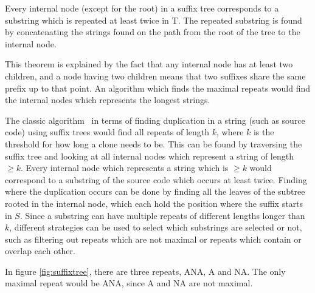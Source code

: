 \begin{theorem}

    Every internal node (except for the root) in a suffix tree corresponds to a substring
    which is repeated at least twice in T. The repeated substring is found by
    concatenating the strings found on the path from the root of the tree to the internal
    node.

\end{theorem}

This theorem is explained by the fact that any internal node has at least two children, and a
node having two children means that two suffixes share the same prefix up to that point.
An algorithm which finds the maximal repeats would find the internal nodes which
represents the longest strings. 

The classic algorithm~\cite{Zibran_real_time_search, GodeIncrementalCloneDetection} in
terms of finding duplication in a string (such as source code) using suffix trees would
find all repeats of length $k$, where $k$ is the threshold for how long a clone needs to
be. This can be found by traversing the suffix tree and looking at all internal nodes
which represent a string of length $\geq k$. Every internal node which represents a string
which is $\geq k$ would correspond to a substring of the source code which occurs at least
twice. Finding where the duplication occurs can be done by finding all the leaves of the
subtree rooted in the internal node, which each hold the position where the suffix starts in
$S$. Since a substring can have multiple repeats of different lengths longer than $k$,
different strategies can be used to select which substrings are selected or not, such as
filtering out repeats which are not maximal or repeats which contain or overlap each other.

In figure \ref{fig:suffixtree}, there are three repeats, ANA, A and NA. The only maximal
repeat would be ANA, since A and NA are not maximal.


